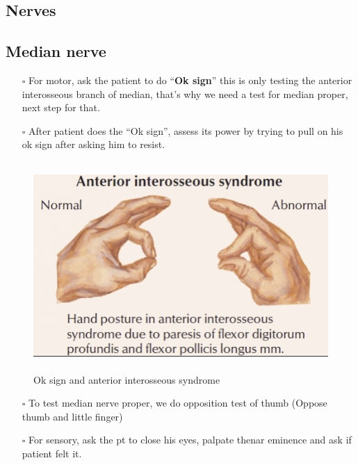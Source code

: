 \documentclass[
  13.5pt,
  a4paper,
  DIV=11,
  numbers=noendperiod]{scrreprt}
\providecommand{\tightlist}{%
  \setlength{\itemsep}{0pt}\setlength{\parskip}{0pt}}
\begin{document}
\subsection{Nerves}\label{nerves}

\subsection{Median nerve}\label{median-nerve}

\begin{itemize}
\tightlist
\item[$\square$]
  For motor, ask the patient to do ``\textbf{Ok sign}'' this is only
  testing the anterior interosseous branch of median, that's why we need
  a test for median proper, next step for that.
\item[$\square$]
  After patient does the ``Ok sign'', assess its power by trying to pull
  on his ok sign after asking him to resist.
\end{itemize}

\begin{figure}[H]

{\centering \includegraphics[width=5.20833in,height=3.125in]{mss1.png}

}

\caption{Ok sign and anterior interosseous syndrome}

\end{figure}%

\begin{itemize}
\tightlist
\item[$\square$]
  To test median nerve proper, we do opposition test of thumb (Oppose
  thumb and little finger)
\item[$\square$]
  For sensory, ask the pt to close his eyes, palpate thenar eminence and
  ask if patient felt it.
\end{itemize}
\end{document}
